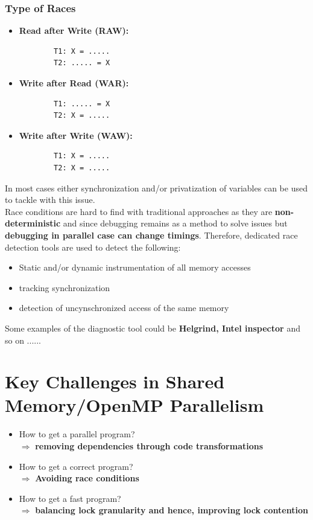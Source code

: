 \documentclass[12pt, a4paper]{report}
\begin{document}
\subsubsection{Type of Races}
\begin{itemize}
    \item {\bfseries{Read after Write (RAW):}}
    \begin{verbatim}
        T1: X = .....
        T2: ..... = X
    \end{verbatim}
    \item {\bfseries{Write after Read (WAR):}}
    \begin{verbatim}
        T1: ..... = X
        T2: X = .....
    \end{verbatim}
    \item {\bfseries{Write after Write (WAW):}}
    \begin{verbatim}
        T1: X = .....
        T2: X = .....
    \end{verbatim}
\end{itemize}
In most cases either synchronization and/or privatization of variables can be used to tackle with this issue.\\

Race conditions are hard to find with traditional approaches as they are {\bfseries{non-deterministic}} and since debugging remains as a method to solve
issues but {\bfseries{debugging in parallel case can change timings}}. Therefore, dedicated race detection tools are used to detect the following:
\begin{itemize}
    \item Static and/or dynamic instrumentation of all memory accesses
    \item tracking synchronization
    \item detection of uncynschronized access of the same memory
\end{itemize}
Some examples of the diagnostic tool could be {\bfseries{Helgrind, Intel inspector}} and so on ......

\section{Key Challenges in Shared Memory/OpenMP Parallelism}
\begin{itemize}
    \item How to get a parallel program? \\$\Rightarrow$ {\bfseries{removing dependencies through code transformations}}
    \item How to get a correct program? \\$\Rightarrow$ {\bfseries{Avoiding race conditions}}
    \item How to get a fast program? \\$\Rightarrow$ {\bfseries{balancing lock granularity and hence, improving lock contention}}
\end{itemize}
\end{document}
